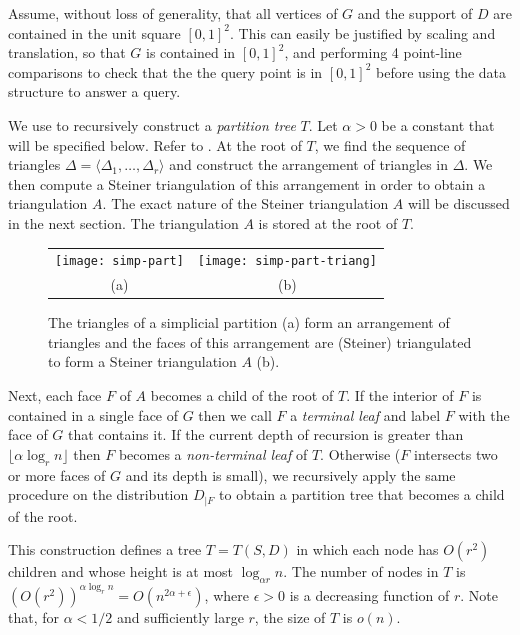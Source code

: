 \documentclass{patmorin}
\begin{document}
Assume, without loss of generality, that all vertices of $G$ and the support
of $D$ are contained in the unit square $[0,1]^2$.  This can easily be
justified by scaling and translation, so that $G$ is contained in $[0,1]^2$, and performing 4 point-line comparisons
to check that the the query point is in $[0,1]^2$ before using the data structure to answer a query.

We use  to recursively construct a \emph{partition
tree} $T$.  Let $\alpha > 0$ be a constant that will be specified below.
Refer to . At the root of $T$, we find the sequence of
triangles $\Delta=\langle\Delta_1,\ldots,\Delta_r\rangle$ and construct
the arrangement of triangles in $\Delta$.  We then compute a Steiner
triangulation of this arrangement in order to obtain a triangulation
$A$. The exact nature of the Steiner triangulation $A$ will be discussed
in the next section.  The triangulation $A$ is stored at the root of $T$.

\begin{figure}
  \begin{center}
    \begin{tabular}{cc}
      \texttt{[image: simp-part]} & \texttt{[image: simp-part-triang]} \\
      (a) & (b)
    \end{tabular}
  \end{center}
  \caption{The triangles of a simplicial partition (a) form an arrangement of
    triangles and the faces of this arrangement are (Steiner) triangulated
    to form a Steiner triangulation $A$ (b).}
\end{figure}

Next, each face $F$ of $A$ becomes a child of the root of $T$.  If the
interior of $F$ is contained in a single face of $G$ then we call $F$ a
\emph{terminal leaf} and label $F$ with the face of $G$ that contains it.
If the current depth of recursion is greater than $\lfloor\alpha \log_{r}
n\rfloor$ then $F$ becomes a \emph{non-terminal leaf} of $T$.  Otherwise
($F$ intersects two or more faces of $G$ and its depth is small),
we recursively apply the same procedure on the distribution $D_{|F}$
to obtain a partition tree that becomes a child of the root.

This construction defines a tree $T=T(S,D)$ in which each node has
$O(r^2)$ children and whose height is at most $\log_{\alpha r} n$.
The number of nodes in $T$ is $(O(r^2))^{\alpha \log_{r} n} =
O(n^{2\alpha+\epsilon})$, where $\epsilon>0$ is a decreasing function
of $r$.  Note that, for $\alpha < 1/2$ and sufficiently large $r$,
the size of $T$ is $o(n)$.
\end{document}
